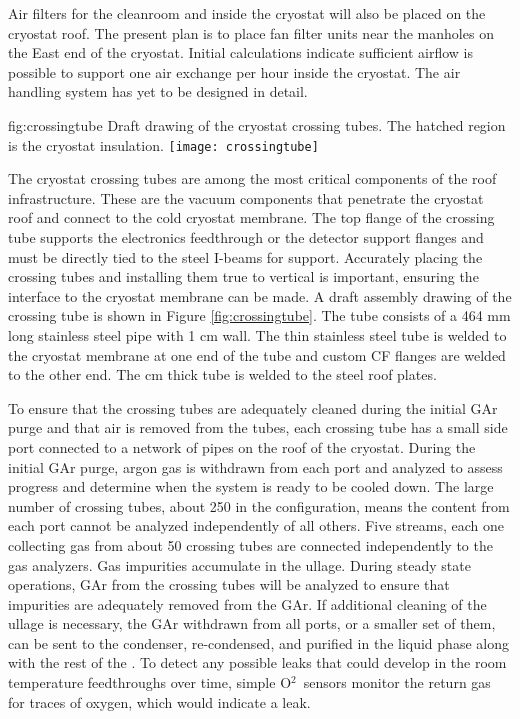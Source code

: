 Air filters for the cleanroom and inside the cryostat will also be placed on the cryostat roof. The present plan is to place fan filter units near the manholes on the East end of the cryostat. Initial calculations indicate sufficient airflow is possible to support one air exchange per hour inside the cryostat. The air handling system has yet to be designed in detail.


\begin{dunefigure}{fig:crossingtube}
  {Draft drawing of the cryostat crossing tubes. The hatched region is the cryostat insulation.}
\texttt{[image: crossingtube]}
\end{dunefigure}

The cryostat crossing tubes are among the most critical components of the roof infrastructure. These are the vacuum components that penetrate the cryostat roof and connect to the cold cryostat membrane. The top flange of the crossing tube supports the electronics feedthrough or the detector support flanges and must be directly tied to the steel I-beams for support. Accurately placing the crossing tubes and installing them true to vertical is important, ensuring the interface to the cryostat membrane can be made. A draft assembly drawing of the crossing tube is shown in Figure \ref{fig:crossingtube}. The tube consists of a 464 \si{mm} long stainless steel pipe with 1 \si{cm} wall. The thin stainless steel tube is welded to the cryostat membrane at one end of the tube and custom CF  flanges are welded to the other end. The \si{cm} thick tube is welded to the steel roof plates.


To ensure that the crossing tubes are adequately cleaned during the initial GAr  purge and that air is removed from the tubes, each crossing tube has a small side port connected to a network of pipes on the roof of the cryostat. During the initial GAr purge, argon gas is withdrawn from each port and analyzed to assess progress and determine when the system is ready to be cooled down. The large number of crossing tubes, about 250 in the  configuration, means the content from each port cannot be analyzed independently of all others. Five streams, each one collecting gas from about 50 crossing tubes are connected independently to the gas analyzers. Gas impurities accumulate in the ullage. During steady state operations, GAr from the crossing tubes will be analyzed to ensure that impurities are adequately removed from the GAr.    If additional cleaning of the ullage is necessary, the GAr withdrawn from all ports, or a smaller set of them, can be sent to the condenser, re-condensed, and purified in the liquid phase along with the rest of the . To detect any possible leaks that could develop in the room temperature feedthroughs over time, simple O$^2$\ sensors monitor the return gas for traces of oxygen, which would indicate a leak.

